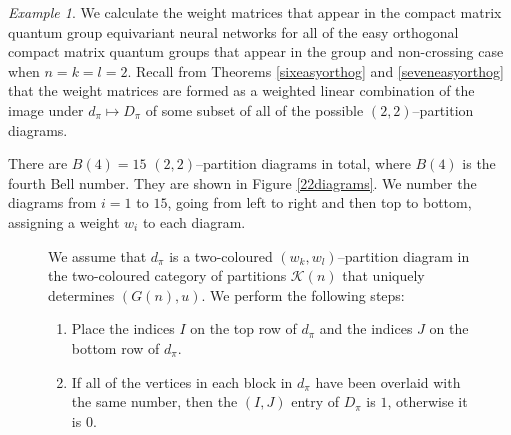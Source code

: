 \documentclass{article}
\theoremstyle{plain}
\theoremstyle{definition}
\theoremstyle{remark}
\newtheorem{example}[theorem]{Example}
\begin{document}
\begin{example}
	We calculate the weight matrices that appear in the compact matrix 
	quantum group equivariant neural networks for all of the easy 
	orthogonal compact matrix quantum groups 
	that appear in the group and non-crossing case
	when $n = k = l = 2$.
Recall from Theorems 
\ref{sixeasyorthog}
and
\ref{seveneasyorthog}
that the weight matrices are formed as a weighted linear combination of the image under $d_\pi \mapsto D_\pi$ of some subset of all of the possible $(2,2)$--partition diagrams.

There are $B(4) = 15$ $(2,2)$--partition diagrams in total, 
where $B(4)$ is the fourth Bell number. 
They are shown in Figure \ref{22diagrams}.
We number the diagrams from $i = 1$ to $15$, going from left to right 
and then top to bottom, assigning a weight $w_i$ to each diagram.


\begin{figure}[tb]
	\begin{tcolorbox}[colback=blue!10, colframe=blue!30, coltitle=black, 
		title={\bfseries Procedure 2: How to Calculate
		the $(I,J)$-entry of each Equivariant Spanning Set Matrix $D_\pi$
		from 
		$((\mathbb{C}^{n})^{\otimes k}, u^{\otimes w_{k}})
		\rightarrow 
		((\mathbb{C}^{n})^{\otimes l}, u^{\otimes w_{l}})$
		for an Easy Compact Matrix Quantum Group $(G(n), u)$.},
		fonttitle=\bfseries]
		We assume that $d_\pi$ is a two-coloured $(w_k, w_l)$--partition diagram 
		in the two-coloured category of partitions $\mathcal{K}(n)$ that 
		uniquely determines $(G(n), u)$.
		We perform the following steps:
	\begin{enumerate}
	\item Place the indices $I$ on the top row of $d_\pi$ and the indices $J$ on the bottom row of $d_\pi$.
	\item If all of the vertices in each block in $d_\pi$ have been overlaid with the same number, then the $(I, J)$ entry of $D_\pi$ is $1$, otherwise it is $0$.
	\end{enumerate}
	\end{tcolorbox}
  	\label{qgrouppowermethod}
\end{figure}




\end{example}
\end{document}
